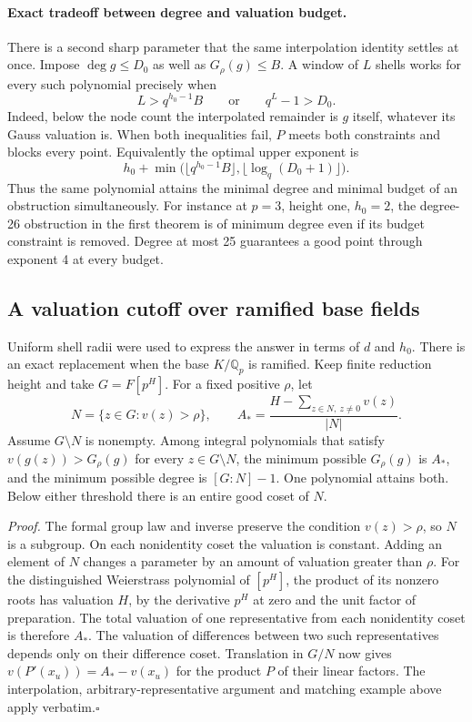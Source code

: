 \paragraph{Exact tradeoff between degree and valuation budget.}
There is a second sharp parameter that the same interpolation identity
settles at once. Impose $\deg g\le D_0$ as well as $G_\rho(g)\le B$.
A window of $L$ shells works for every such polynomial precisely when
\[
 L>q^{h_0-1}B\qquad\text{or}\qquad q^L-1>D_0 .
\]
Indeed, below the node count the interpolated remainder is $g$ itself,
whatever its Gauss valuation is. When both inequalities fail, $P$
meets both constraints and blocks every point. Equivalently the optimal
upper exponent is
\[
 h_0+\min\bigl(\lfloor q^{h_0-1}B\rfloor,
                    \lfloor\log_q(D_0+1)\rfloor\bigr).
\]
Thus the same polynomial attains the minimal degree and minimal budget of
an obstruction simultaneously. For instance at $p=3$, height one,
$h_0=2$, the degree-26 obstruction in the first theorem is of minimum
degree even if its budget constraint is removed. Degree at most 25
guarantees a good point through exponent 4 at every budget.

\subsection{A valuation cutoff over ramified base fields}
Uniform shell radii were used to express the answer in terms of $d$
and $h_0$. There is an exact replacement when the base $K/\mathbb Q_p$
is ramified. Keep finite reduction height and take $G=F[p^H]$.
For a fixed positive $\rho$, let
\[
 N=\{z\in G:v(z)>\rho\},\qquad
 A_*=\frac{H-\sum_{z\in N,\ z\ne0}v(z)}{|N|}.
\]
Assume $G\setminus N$ is nonempty. Among integral polynomials
that satisfy $v(g(z))>G_\rho(g)$ for every $z\in G\setminus N$, the
minimum possible $G_\rho(g)$ is $A_*$, and the minimum possible degree
is $[G:N]-1$. One polynomial attains both. Below either threshold
there is an entire good coset of $N$.

\emph{Proof.} The formal group law and inverse preserve the condition
$v(z)>\rho$, so $N$ is a subgroup. On each nonidentity coset the
valuation is constant. Adding an element of $N$ changes a parameter by
an amount of valuation greater than $\rho$. For the distinguished
Weierstrass polynomial of $[p^H]$, the product of its nonzero roots
has valuation $H$, by the derivative $p^H$ at zero and the
unit factor of preparation. The total valuation of one representative
from each nonidentity coset is therefore $A_*$. The valuation of
differences between two such representatives depends only on their
difference coset. Translation in $G/N$ now gives
$v(P'(x_u))=A_*-v(x_u)$ for the product $P$ of their linear factors.
The interpolation, arbitrary-representative argument and matching
example above apply verbatim.\hfill$\square$


